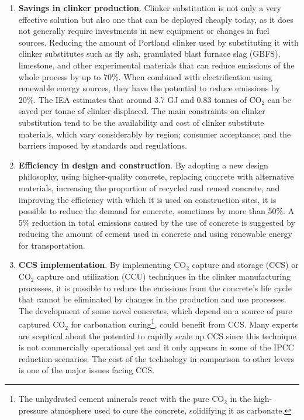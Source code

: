 \begin{enumerate}
\item \textbf{Savings in clinker production}. Clinker substitution is not only a very effective solution but also one that can be deployed cheaply today, as it does not generally require investments in new equipment or changes in fuel sources.\autocite{lehne2018making} Reducing the amount of Portland clinker used by substituting it with clinker substitutes such as fly ash, granulated blast furnace slag (GBFS), limestone, and other experimental materials that can reduce emissions of the whole process by up to 70\%. When combined with electrification using renewable energy sources, they have the potential to reduce emissions by 20\%. The IEA estimates that around 3.7 GJ and 0.83 tonnes of CO$_2$ can be saved per tonne of clinker displaced.\autocite{iea2017energy} The main constraints on clinker substitution tend to be the availability and cost of clinker substitute materials, which vary considerably by region; consumer acceptance; and the barriers imposed by standards and regulations.\autocite{imbabi2012trends}
\item \textbf{Efficiency in design and construction}. By adopting a new design philosophy, using higher-quality concrete, replacing concrete with alternative materials, increasing the proportion of recycled and reused concrete, and improving the efficiency with which it is used on construction sites, it is possible to reduce the demand for concrete, sometimes by more than 50\%.\autocite{lehne2018making} A 5\% reduction in total emissions caused by the use of concrete is suggested by reducing the amount of cement used in concrete and using renewable energy for transportation.\autocite{aus_2022} 
\item \textbf{CCS implementation}. By implementing CO$_2$ capture and storage (CCS) or CO$_2$ capture and utilization (CCU) techniques in the clinker manufacturing processes, it is possible to reduce the emissions from the concrete's life cycle that cannot be eliminated by changes in the production and use processes. The development of some novel concretes, which depend on a source of pure captured CO$_2$ for carbonation curing\footnote{The unhydrated cement minerals react with the pure CO$_2$ in the high-pressure atmosphere used to cure the concrete, solidifying it as carbonate.}, could benefit from CCS. Many experts are sceptical about the potential to rapidly scale up CCS since this technique is not commercially operational yet and it only appears in some of the IPCC reduction scenarios. The cost of the technology in comparison to other levers is one of the major issues facing CCS.
\end{enumerate}

